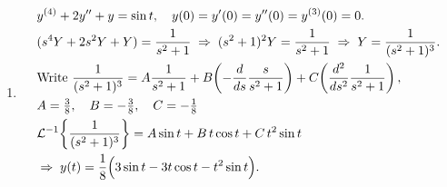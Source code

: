 \documentclass[11pt]{article}
\begin{document}
\begin{enumerate}[label=(\arabic*)]
\item
\[
\begin{aligned}
&y^{(4)}+2y''+y=\sin t,\quad y(0)=y'(0)=y''(0)=y^{(3)}(0)=0.\\
&(s^4Y+2s^2Y+Y)=\frac{1}{s^2+1}
\;\Rightarrow\;
(s^2+1)^2Y=\frac{1}{s^2+1}
\;\Rightarrow\;
Y=\frac{1}{(s^2+1)^3}.\\
&\text{Write } \frac{1}{(s^2+1)^3}
= A\frac{1}{s^2+1}
+ B\!\left(-\frac{d}{ds}\frac{s}{s^2+1}\right)
+ C\!\left(\frac{d^2}{ds^2}\frac{1}{s^2+1}\right),\\
&A=\tfrac{3}{8},\quad B=-\tfrac{3}{8},\quad C=-\tfrac{1}{8}\\
&\mathcal{L}^{-1}\!\left\{\frac{1}{(s^2+1)^3}\right\}
=A\sin t+B\,t\cos t+C\,t^2\sin t\\
&\Rightarrow\;
y(t)=\frac{1}{8}\Bigl(3\sin t-3t\cos t-t^2\sin t\Bigr).
\end{aligned}
\]

\end{enumerate}
\end{document}
